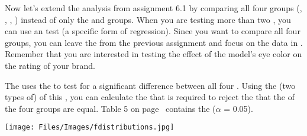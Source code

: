 \setcounter{chapter}{6}
\setcounter{section}{2}
\setcounter{question}{0}



Now let’s extend the analysis from assignment 6.1 by comparing all four groups (, , , ) instead of only the  and  groups. When you are testing more than two , you can use an  test (a specific form of regression). Since you want to compare all four groups, you can leave the  from the previous assignment and focus on the data in . Remember that you are interested in testing the effect of the model’s eye color on the rating of your brand. \\


\hypothesesbox

The  uses the  to test for a significant difference between all four . Using the (two types of)  of this , you can calculate the  that is required to reject the  that the  of the four groups are equal. Table 5 on page~\pageref{table5} contains the  ($\alpha$ = 0.05).
\vspace*{.5cm}
\begin{center}
    \texttt{[image: Files/Images/fdistributions.jpg]}
\end{center}




